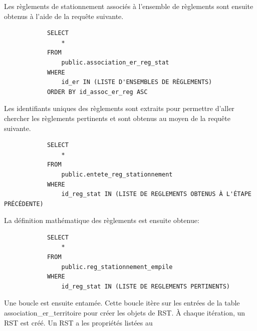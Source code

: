         Les règlements de stationnement associés à l'ensemble de règlements sont ensuite obtenus à l'aide de la requête suivante. \par
        \begin{verbatim}
            SELECT 
                *
            FROM 
                public.association_er_reg_stat
            WHERE
                id_er IN (LISTE D'ENSEMBLES DE RÈGLEMENTS)
            ORDER BY id_assoc_er_reg ASC
        \end{verbatim}
        Les identifiants uniques des règlements sont extraits pour permettre d'aller chercher les règlements pertinents et sont obtenus au moyen de la requête suivante. \par
        \begin{verbatim}
            SELECT
                *
            FROM
                public.entete_reg_stationnement
            WHERE 
                id_reg_stat IN (LISTE DE REGLEMENTS OBTENUS À L'ÉTAPE PRÉCÉDENTE)
        \end{verbatim}
        La définition mathématique des règlements est ensuite obtenue:
        \begin{verbatim}
            SELECT 
                *
            FROM 
                public.reg_stationnement_empile
            WHERE 
                id_reg_stat IN (LISTE DE REGLEMENTS PERTINENTS)
        \end{verbatim}
        Une boucle est ensuite entamée. Cette boucle itère sur les entrées de la table association\_er\_territoire pour créer les objets de \ac{RST}. À chaque itération, un \ac{RST} est créé. Un RST a les propriétés listées au 
